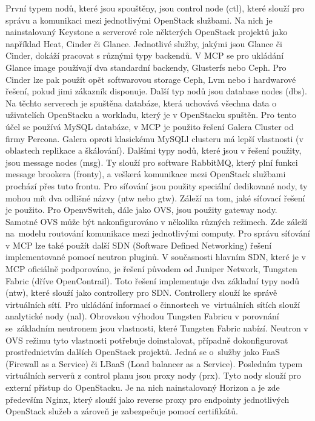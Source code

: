 První typem nodů, které jsou spouštěny, jsou control node (ctl), které slouží pro správu a komunikaci mezi jednotlivými OpenStack službami. Na nich je nainstalovaný Keystone a serverové role některých OpenStack projektů jako například Heat, Cinder či Glance. Jednotlivé služby, jakými jsou Glance či Cinder, dokáží pracovat s různými typy backendů. V MCP se pro ukládání Glance image používají dva standardní backendy, Glusterfs nebo Ceph. Pro Cinder lze pak použít opět softwarovou storage Ceph, Lvm nebo i hardwarové řešení, pokud jimi zákazník disponuje. Další typ nodů jsou database nodes (dbs). Na těchto serverech je spuštěna databáze, která uchovává všechna data o uživatelích OpenStacku a workladu, který je v OpenStacku spuštěn. Pro tento účel se používá MySQL databáze, v MCP je použito řešení Galera Cluster od firmy Percona. Galera oproti klasickému MySQLl clusteru má lepší vlastnosti (v oblastech replikace a škálování). Dalšími typy nodů, které jsou v řešení použity, jsou message nodes (msg). Ty slouží pro software RabbitMQ, který plní funkci message brookera (fronty), a veškerá komunikace mezi OpenStack službami prochází přes tuto frontu. Pro síťování jsou použity speciální dedikované nody, ty mohou mít dva odlišné názvy (ntw nebo gtw). Záleží na tom, jaké síťovací řešení je použito. Pro OpenvSwitch, dále jako OVS, jsou použity gateway nody. Samotné OVS může být nakonfigurováno v několika různých režimech. Zde záleží na modelu routování komunikace mezi jednotlivými computy. Pro správu síťování v MCP lze také použít další SDN (Software Defined Networking) řešení implementované pomocí neutron pluginů. V současnosti hlavním SDN, které je v MCP oficiálně podporováno, je řešení původem od Juniper Network, Tungsten Fabric (dříve OpenContrail). Toto řešení implementuje dva základní typy nodů (ntw), které slouží jako controllery pro SDN. Controllery slouží ke správě virtuálních sítí. Pro ukládání informací o činnostech ve virtuálních sítích slouží analytické nody (nal). Obrovskou výhodou Tungsten Fabricu v porovnání se základním neutronem jsou vlastnosti, které Tungsten Fabric nabízí. Neutron v OVS režimu tyto vlastnosti potřebuje doinstalovat, případně dokonfigurovat prostřednictvím dalších OpenStack projektů. Jedná se o služby jako FaaS (Firewall as a Service) či LBaaS (Load balancer as a Service). Posledním typem virtuálních serverů z control planu jsou proxy nody (prx). Tyto nody slouží pro externí přístup do OpenStacku. Je na nich nainstalovaný Horizon a je zde především Nginx, který slouží jako reverse proxy pro endpointy jednotlivých OpenStack služeb a zároveň je zabezpečuje pomocí certifikátů.

